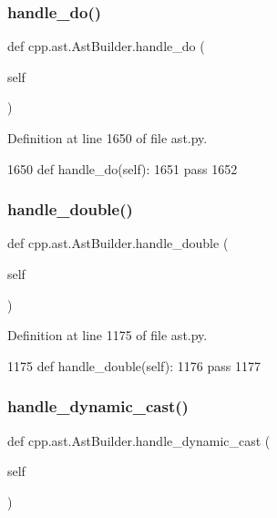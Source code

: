 \subsubsection{\texorpdfstring{handle\+\_\+do()}{handle\_do()}}
{\footnotesize\ttfamily def cpp.\+ast.\+Ast\+Builder.\+handle\+\_\+do (\begin{DoxyParamCaption}\item[{}]{self }\end{DoxyParamCaption})}



Definition at line 1650 of file ast.\+py.


\begin{DoxyCode}
1650     \textcolor{keyword}{def }handle\_do(self):
1651         \textcolor{keywordflow}{pass}
1652 
\end{DoxyCode}
\mbox{\label{classcpp_1_1ast_1_1AstBuilder_ad1bd68af800dafcafdfa56e474f9d642}} 
\subsubsection{\texorpdfstring{handle\+\_\+double()}{handle\_double()}}
{\footnotesize\ttfamily def cpp.\+ast.\+Ast\+Builder.\+handle\+\_\+double (\begin{DoxyParamCaption}\item[{}]{self }\end{DoxyParamCaption})}



Definition at line 1175 of file ast.\+py.


\begin{DoxyCode}
1175     \textcolor{keyword}{def }handle\_double(self):
1176         \textcolor{keywordflow}{pass}
1177 
\end{DoxyCode}
\mbox{\label{classcpp_1_1ast_1_1AstBuilder_a659b5ad02ffebe26c1496a319128fbd1}} 
\subsubsection{\texorpdfstring{handle\+\_\+dynamic\+\_\+cast()}{handle\_dynamic\_cast()}}
{\footnotesize\ttfamily def cpp.\+ast.\+Ast\+Builder.\+handle\+\_\+dynamic\+\_\+cast (\begin{DoxyParamCaption}\item[{}]{self }\end{DoxyParamCaption})}



